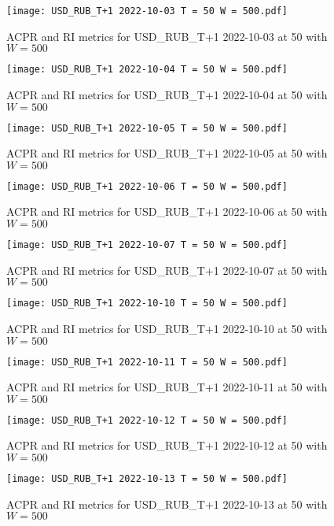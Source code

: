 \begin{figure}[htbp]
	\texttt{[image: USD\_RUB\_T+1 2022-10-03 T = 50 W = 500.pdf]}
	\caption{ACPR and RI metrics for USD\_RUB\_T+1 2022-10-03 at 50 with $W = 500$}
\end{figure}

\begin{figure}[htbp]
	\texttt{[image: USD\_RUB\_T+1 2022-10-04 T = 50 W = 500.pdf]}
	\caption{ACPR and RI metrics for USD\_RUB\_T+1 2022-10-04 at 50 with $W = 500$}
\end{figure}

\begin{figure}[htbp]
	\texttt{[image: USD\_RUB\_T+1 2022-10-05 T = 50 W = 500.pdf]}
	\caption{ACPR and RI metrics for USD\_RUB\_T+1 2022-10-05 at 50 with $W = 500$}
\end{figure}

\begin{figure}[htbp]
	\texttt{[image: USD\_RUB\_T+1 2022-10-06 T = 50 W = 500.pdf]}
	\caption{ACPR and RI metrics for USD\_RUB\_T+1 2022-10-06 at 50 with $W = 500$}
\end{figure}

\begin{figure}[htbp]
	\texttt{[image: USD\_RUB\_T+1 2022-10-07 T = 50 W = 500.pdf]}
	\caption{ACPR and RI metrics for USD\_RUB\_T+1 2022-10-07 at 50 with $W = 500$}
\end{figure}

\begin{figure}[htbp]
	\texttt{[image: USD\_RUB\_T+1 2022-10-10 T = 50 W = 500.pdf]}
	\caption{ACPR and RI metrics for USD\_RUB\_T+1 2022-10-10 at 50 with $W = 500$}
\end{figure}

\begin{figure}[htbp]
	\texttt{[image: USD\_RUB\_T+1 2022-10-11 T = 50 W = 500.pdf]}
	\caption{ACPR and RI metrics for USD\_RUB\_T+1 2022-10-11 at 50 with $W = 500$}
\end{figure}

\begin{figure}[htbp]
	\texttt{[image: USD\_RUB\_T+1 2022-10-12 T = 50 W = 500.pdf]}
	\caption{ACPR and RI metrics for USD\_RUB\_T+1 2022-10-12 at 50 with $W = 500$}
\end{figure}

\begin{figure}[htbp]
	\texttt{[image: USD\_RUB\_T+1 2022-10-13 T = 50 W = 500.pdf]}
	\caption{ACPR and RI metrics for USD\_RUB\_T+1 2022-10-13 at 50 with $W = 500$}
\end{figure}

